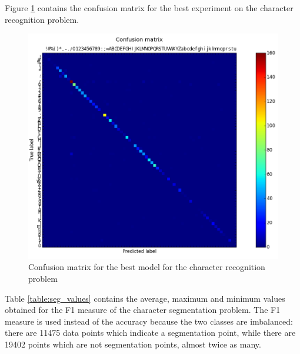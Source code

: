 Figure \ref{fig:conf_matrix} contains the confusion matrix for the best experiment on the character recognition problem.


\begin{figure}[h!]
\begin{center}
\includegraphics[width=0.8\linewidth]{img/rec_cm.png}
\caption{\label{fig:conf_matrix}
Confusion matrix for the best model for the character recognition problem}
\end{center}
\end{figure}

Table \ref{table:seg_values} contains the average, maximum and minimum values obtained for the F1 measure\cite{fawcett2006introduction} of the character segmentation problem. The F1 measure is used instead of the accuracy because the two classes are imbalanced: there are 11475 data points which indicate a segmentation point, while there are 19402 points which are not segmentation points, almost twice as many. 

